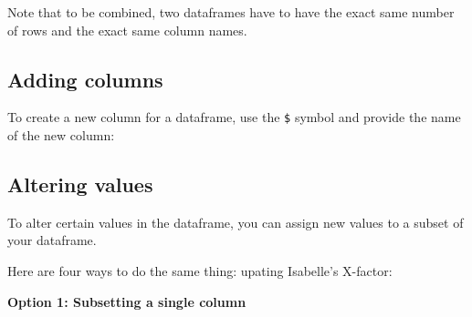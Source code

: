 \documentclass[
]{book}
\newenvironment{Shaded}{\begin{snugshade}}{\end{snugshade}}
\newcommand{\DecValTok}[1]{\textcolor[rgb]{0.00,0.00,0.81}{#1}}
\newcommand{\FunctionTok}[1]{\textcolor[rgb]{0.13,0.29,0.53}{\textbf{#1}}}
\newcommand{\NormalTok}[1]{#1}
\newcommand{\OtherTok}[1]{\textcolor[rgb]{0.56,0.35,0.01}{#1}}
\newcommand{\SpecialCharTok}[1]{\textcolor[rgb]{0.81,0.36,0.00}{\textbf{#1}}}
\begin{document}
Note that to be combined, two dataframes have to have the exact same number of rows and the exact same column names.

\subsection*{Adding columns}\label{adding-columns}

To create a new column for a dataframe, use the \texttt{\$} symbol and provide the name of the new column:

\begin{Shaded}
\end{Shaded}

\subsection*{Altering values}\label{altering-values}

To alter certain values in the dataframe, you can assign new values to a subset of your dataframe.

Here are four ways to do the same thing: upating Isabelle's X-factor:

\textbf{Option 1: Subsetting a single column}

\begin{Shaded}
\end{Shaded}
\end{document}
